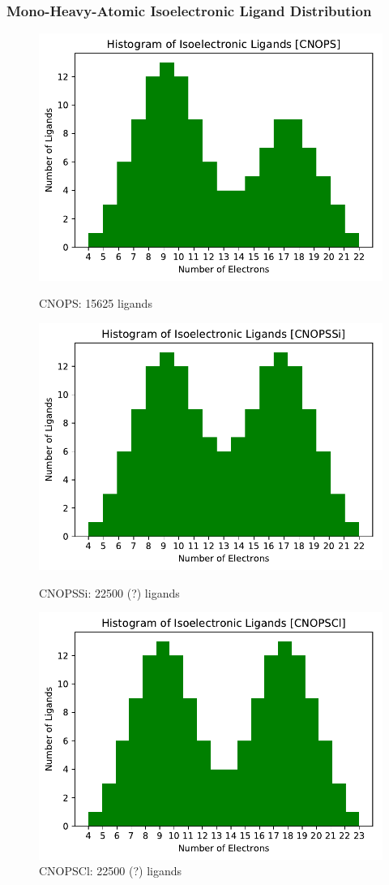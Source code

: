 \documentclass{beamer}
\begin{document}
\begin{frame}
\frametitle{Mono-Heavy-Atomic Isoelectronic Ligand Distribution}
\begin{figure}[ht] 
	\label{ fig7} 
	\begin{minipage}[b]{0.5\linewidth}
		\centering
		\includegraphics[width=.5\linewidth]{img/hist_iso_ligands_CNOPS.pdf} 
		\caption{CNOPS: 15625 ligands} 
		\vspace{4ex}
	\end{minipage}%
	\begin{minipage}[b]{0.5\linewidth}
		\centering
		\includegraphics[width=.5\linewidth]{img/hist_iso_ligands_CNOPSSi.pdf} 
		\caption{CNOPSSi: 22500 (?) ligands} 
		\vspace{4ex}
	\end{minipage} 
	\begin{minipage}[b]{0.5\linewidth}
		\centering
		\includegraphics[width=.5\linewidth]{img/hist_iso_ligands_CNOPSCl.pdf} 
		\caption{CNOPSCl: 22500 (?) ligands} 
		\vspace{4ex}
	\end{minipage}%
	\begin{minipage}[b]{0.5\linewidth}

\end{minipage}
\end{figure}
\end{frame}
\end{document}
